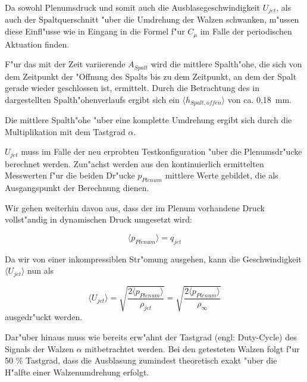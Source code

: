 Da sowohl Plenumsdruck und somit auch die Ausblasegeschwindigkeit $U_{jet}$, als auch der Spaltquerschnitt "uber die Umdrehung der Walzen schwanken, m"ussen diese Einfl"usse wie in  Eingang in die Formel f"ur $C_{\mu}$ im Falle der periodischen Aktuation finden.

F"ur das mit der Zeit variierende $A_{Spalt}$   wird die mittlere Spalth"ohe, die sich von dem Zeitpunkt der "Offnung des Spalts bis zu dem Zeitpunkt, an dem der Spalt gerade wieder geschlossen ist, ermittelt.  
Durch die Betrachtung des in  dargestellten Spalth"ohenverlaufs ergibt sich ein $\langle{h_{Spalt,offen}}\rangle$ von ca. 0,18 \,mm.

Die mittlere Spalth"ohe "uber eine komplette Umdrehung ergibt sich durch die Multiplikation mit dem Tastgrad $\alpha$.


$U_{jet}$ muss im Falle der neu erprobten Testkonfiguration "uber die Plenumsdr"ucke berechnet werden.
Zun"achst werden aus den kontinuierlich ermittelten Messwerten f"ur die beiden Dr"ucke $p_{Plenum}$ mittlere Werte gebildet, die als Ausgangspunkt der Berechnung dienen.

Wir gehen weiterhin davon aus, dass der im Plenum vorhandene Druck vollst"andig in dynamischen Druck umgesetzt wird:

	\begin{equation}
	\label{eq:Annahme q}
		\langle{p_{Plenum}}\rangle = q_{jet}
	\end{equation}

Da wir  von einer inkompressiblen Str"omung ausgehen, kann die Geschwindigkeit $\langle{U_{jet}}\rangle$ nun als
	
	\begin{equation}
	\label{eq:jetgeschwindigkeit}
		\langle{U_{jet}}\rangle = \sqrt{\frac{2 \langle{p_{Plenum}}\rangle}{\rho_{jet}}} = \sqrt{\frac{2 \langle{p_{Plenum}}\rangle}{\rho_{\infty}}}
	\end{equation}
ausgedr"uckt werden.

Dar"uber hinaus muss wie bereits erw"ahnt der Tastgrad (engl: Duty-Cycle) des Signals der Walzen $\alpha$  mitbetrachtet werden.
Bei den getesteten Walzen folgt f"ur 50 \% Tastgrad, dass die Ausblasung zumindest theoretisch exakt "uber die H"alfte einer Walzenumdrehung erfolgt.

